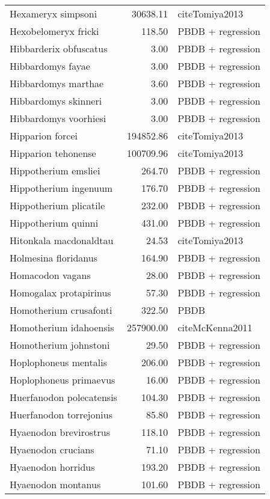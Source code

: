 \begin{table}[ht]
\begin{tabular}{lrl}
  Hexameryx simpsoni & 30638.11 & cite{Tomiya2013} \\ 
  Hexobelomeryx fricki & 118.50 & PBDB + regression \\ 
  Hibbarderix obfuscatus & 3.00 & PBDB + regression \\ 
  Hibbardomys fayae & 3.00 & PBDB + regression \\ 
  Hibbardomys marthae & 3.60 & PBDB + regression \\ 
  Hibbardomys skinneri & 3.00 & PBDB + regression \\ 
  Hibbardomys voorhiesi & 3.00 & PBDB + regression \\ 
  Hipparion forcei & 194852.86 & cite{Tomiya2013} \\ 
  Hipparion tehonense & 100709.96 & cite{Tomiya2013} \\ 
  Hippotherium emsliei & 264.70 & PBDB + regression \\ 
  Hippotherium ingenuum & 176.70 & PBDB + regression \\ 
  Hippotherium plicatile & 232.00 & PBDB + regression \\ 
  Hippotherium quinni & 431.00 & PBDB + regression \\ 
  Hitonkala macdonaldtau & 24.53 & cite{Tomiya2013} \\ 
  Holmesina floridanus & 164.90 & PBDB + regression \\ 
  Homacodon vagans & 28.00 & PBDB + regression \\ 
  Homogalax protapirinus & 57.30 & PBDB + regression \\ 
  Homotherium crusafonti & 322.50 & PBDB \\ 
  Homotherium idahoensis & 257900.00 & cite{McKenna2011} \\ 
  Homotherium johnstoni & 29.50 & PBDB + regression \\ 
  Hoplophoneus mentalis & 206.00 & PBDB + regression \\ 
  Hoplophoneus primaevus & 16.00 & PBDB + regression \\ 
  Huerfanodon polecatensis & 104.30 & PBDB + regression \\ 
  Huerfanodon torrejonius & 85.80 & PBDB + regression \\ 
  Hyaenodon brevirostrus & 118.10 & PBDB + regression \\ 
  Hyaenodon crucians & 71.10 & PBDB + regression \\ 
  Hyaenodon horridus & 193.20 & PBDB + regression \\ 
  Hyaenodon montanus & 101.60 & PBDB + regression \\ 

\end{tabular}
\end{table}
